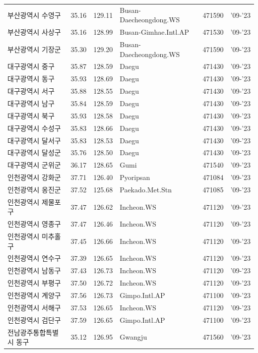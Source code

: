 \begin{longtable}{lcclcc}
  부산광역시 수영구 & 35.16 & 129.11 & Busan-Daecheongdong.WS & 471590 & '09-'23 \\
  부산광역시 사상구 & 35.16 & 128.99 & Busan-Gimhae.Intl.AP & 471530 & '09-'23 \\
  부산광역시 기장군 & 35.30 & 129.20 & Busan-Daecheongdong.WS & 471590 & '09-'23 \\
  대구광역시 중구 & 35.87 & 128.59 & Daegu & 471430 & '09-'23 \\
  대구광역시 동구 & 35.93 & 128.69 & Daegu & 471430 & '09-'23 \\
  대구광역시 서구 & 35.88 & 128.55 & Daegu & 471430 & '09-'23 \\
  대구광역시 남구 & 35.84 & 128.59 & Daegu & 471430 & '09-'23 \\
  대구광역시 북구 & 35.93 & 128.58 & Daegu & 471430 & '09-'23 \\
  대구광역시 수성구 & 35.83 & 128.66 & Daegu & 471430 & '09-'23 \\
  대구광역시 달서구 & 35.83 & 128.53 & Daegu & 471430 & '09-'23 \\
  대구광역시 달성군 & 35.76 & 128.50 & Daegu & 471430 & '09-'23 \\
  대구광역시 군위군 & 36.17 & 128.65 & Gumi & 471540 & '09-'23 \\
  인천광역시 강화군 & 37.71 & 126.40 & Pyoripsan & 471084 & '09-'23 \\
  인천광역시 옹진군 & 37.52 & 125.68 & Paekado.Met.Stn & 471085 & '09-'23 \\
  인천광역시 제물포구 & 37.47 & 126.62 & Incheon.WS & 471120 & '09-'23 \\
  인천광역시 영종구 & 37.47 & 126.46 & Incheon.WS & 471120 & '09-'23 \\
  인천광역시 미추홀구 & 37.45 & 126.66 & Incheon.WS & 471120 & '09-'23 \\
  인천광역시 연수구 & 37.39 & 126.65 & Incheon.WS & 471120 & '09-'23 \\
  인천광역시 남동구 & 37.43 & 126.73 & Incheon.WS & 471120 & '09-'23 \\
  인천광역시 부평구 & 37.50 & 126.72 & Incheon.WS & 471120 & '09-'23 \\
  인천광역시 계양구 & 37.56 & 126.73 & Gimpo.Intl.AP & 471100 & '09-'23 \\
  인천광역시 서해구 & 37.53 & 126.65 & Incheon.WS & 471120 & '09-'23 \\
  인천광역시 검단구 & 37.59 & 126.65 & Gimpo.Intl.AP & 471100 & '09-'23 \\
  전남광주통합특별시 동구 & 35.12 & 126.95 & Gwangju & 471560 & '09-'23 \\

\end{longtable}
